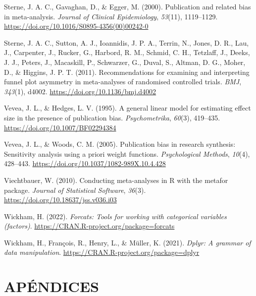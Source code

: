 \documentclass[
  bookmarksnumbered]{article}
\newlength{\cslhangindent}
\newlength{\cslentryspacingunit} %
\newenvironment{CSLReferences}[2] %
 {%
  \setlength{\parindent}{0pt}
  \ifodd #1
  \let\oldpar\par
  \def\par{\hangindent=\cslhangindent\oldpar}
  \fi
  \setlength{\parskip}{#2\cslentryspacingunit}
 }%
 {}
\begin{document}
\begin{CSLReferences}{1}{0}
\leavevmode{}%
Sterne, J. A. C., Gavaghan, D., \& Egger, M. (2000). Publication and related bias in meta-analysis. \emph{Journal of Clinical Epidemiology}, \emph{53}(11), 1119--1129. \url{https://doi.org/10.1016/S0895-4356(00)00242-0}

\leavevmode{}%
Sterne, J. A. C., Sutton, A. J., Ioannidis, J. P. A., Terrin, N., Jones, D. R., Lau, J., Carpenter, J., Rucker, G., Harbord, R. M., Schmid, C. H., Tetzlaff, J., Deeks, J. J., Peters, J., Macaskill, P., Schwarzer, G., Duval, S., Altman, D. G., Moher, D., \& Higgins, J. P. T. (2011). Recommendations for examining and interpreting funnel plot asymmetry in meta-analyses of randomised controlled trials. \emph{BMJ}, \emph{343}(1), d4002. \url{https://doi.org/10.1136/bmj.d4002}

\leavevmode{}%
Vevea, J. L., \& Hedges, L. V. (1995). A general linear model for estimating effect size in the presence of publication bias. \emph{Psychometrika}, \emph{60}(3), 419--435. \url{https://doi.org/10.1007/BF02294384}

\leavevmode{}%
Vevea, J. L., \& Woods, C. M. (2005). Publication bias in research synthesis: Sensitivity analysis using a priori weight functions. \emph{Psychological Methods}, \emph{10}(4), 428--443. \url{https://doi.org/10.1037/1082-989X.10.4.428}

\leavevmode{}%
Viechtbauer, W. (2010). Conducting meta-analyses in {R} with the metafor package. \emph{Journal of Statistical Software}, \emph{36}(3). \url{https://doi.org/10.18637/jss.v036.i03}

\leavevmode{}%
Wickham, H. (2022). \emph{Forcats: Tools for working with categorical variables (factors)}. \url{https://CRAN.R-project.org/package=forcats}

\leavevmode{}%
Wickham, H., François, R., Henry, L., \& Müller, K. (2021). \emph{Dplyr: A grammar of data manipulation}. \url{https://CRAN.R-project.org/package=dplyr}

\end{CSLReferences}

\hypertarget{apuxe9ndices}{%
\section*{APÉNDICES}\label{apuxe9ndices}}
\end{document}
